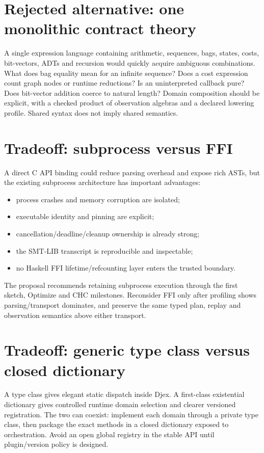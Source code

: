 \documentclass[11pt,oneside]{report}
\begin{document}
\section{Rejected alternative: one monolithic contract theory}

A single expression language containing arithmetic, sequences, bags, states, costs, bit-vectors, ADTs and recursion would quickly acquire ambiguous combinations. What does bag equality mean for an infinite sequence? Does a cost expression count graph nodes or runtime reductions? Is an uninterpreted callback pure? Does bit-vector addition coerce to natural length? Domain composition should be explicit, with a checked product of observation algebras and a declared lowering profile. Shared syntax does not imply shared semantics.

\section{Tradeoff: subprocess versus FFI}

A direct C API binding could reduce parsing overhead and expose rich ASTs, but the existing subprocess architecture has important advantages:

\begin{itemize}[leftmargin=2em]
\item process crashes and memory corruption are isolated;
\item executable identity and pinning are explicit;
\item cancellation/deadline/cleanup ownership is already strong;
\item the SMT-LIB transcript is reproducible and inspectable;
\item no Haskell FFI lifetime/refcounting layer enters the trusted boundary.
\end{itemize}

The proposal recommends retaining subprocess execution through the first sketch, Optimize and CHC milestones. Reconsider FFI only after profiling shows parsing/transport dominates, and preserve the same typed plan, replay and observation semantics above either transport.

\section{Tradeoff: generic type class versus closed dictionary}

A type class gives elegant static dispatch inside Djex. A first-class existential dictionary gives controlled runtime domain selection and clearer versioned registration. The two can coexist: implement each domain through a private type class, then package the exact methods in a closed dictionary exposed to orchestration. Avoid an open global registry in the stable API until plugin/version policy is designed.
\end{document}
